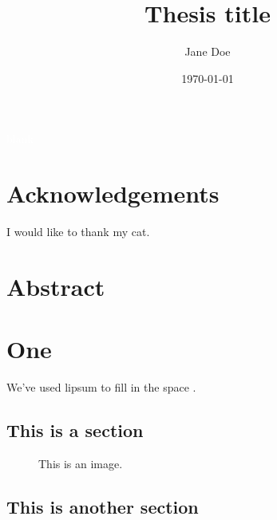 \documentclass[a4paper, twoside, openright, 12pt]{bhamthesis}
\title{Thesis title}
\author{Jane Doe}
\date{\today}
\begin{document}
\frontmatter
\begin{titlepage}
\thispagestyle{empty}
\maketitle
\end{titlepage}

\newpage
\textcolor{white}{blank}
\newpage

\chapter*{Acknowledgements}
\thispagestyle{empty}
I would like to thank my cat.

\chapter*{Abstract}
\thispagestyle{empty}
\lipsum[1-3] 

\newpage

\pagestyle{empty}
\clearpage

\tableofcontents

\mainmatter

\hypersetup{pageanchor=true}
\setcounter{page}{1}

\chapter{One}%
\label{chap:one}
\thispagestyle{empty}

We've used lipsum to fill in the space \cite{lipsum}.

\lipsum[4]

\section{This is a section}%
\label{sec:one:section_one}

\lipsum[5]

\begin{figure}
	\centering
  \resizebox{0.6\linewidth}{!}{}
	\caption{This is an image.}
	\label{fig:image1}
\end{figure}

\lipsum[6-7]


\section{This is another section}%
\label{sec:one:section_two}
\end{document}
